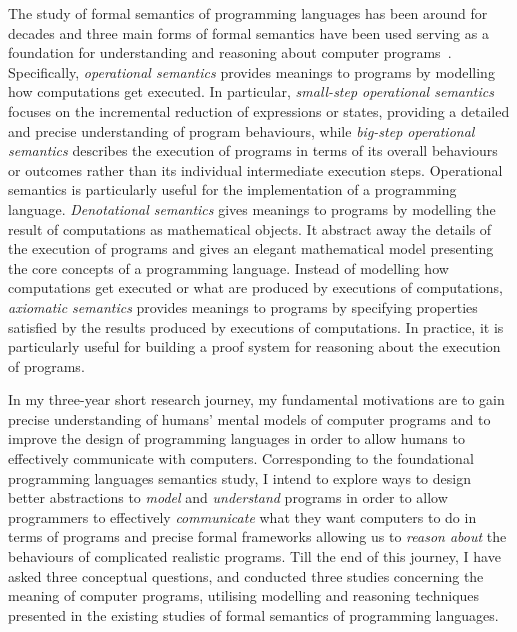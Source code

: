 The study of formal semantics of programming languages has been around for decades and three main forms of formal semantics have been used serving as a foundation for understanding and reasoning about computer programs~\citep{10.5555/151145, citeulike:105547}. Specifically, \emph{operational semantics} provides meanings to programs by modelling how computations get executed. In particular, \emph{small-step operational semantics} focuses on the incremental reduction of expressions or states, providing a detailed and precise understanding of program behaviours, while \emph{big-step operational semantics} describes the execution of programs in terms of its overall behaviours or outcomes rather than its individual intermediate execution steps. Operational semantics is particularly useful for the implementation of a programming language. \emph{Denotational semantics} gives meanings to programs by modelling the result of computations as mathematical objects. It abstract away the details of the execution of programs and gives an elegant mathematical model presenting the core concepts of a programming language. Instead of modelling how computations get executed or what are produced by executions of computations, \emph{axiomatic semantics} provides meanings to programs by specifying properties satisfied by the results produced by executions of computations. In practice, it is particularly useful for building a proof system for reasoning about the execution of programs.

In my three-year short research journey, my fundamental motivations are to gain precise understanding of humans' mental models of computer programs and to improve the design of programming languages in order to allow humans to effectively communicate with computers. Corresponding to the foundational programming languages semantics study, I intend to explore ways to design better abstractions to \emph{model} and \emph{understand} programs in order to allow programmers to effectively \emph{communicate} what they want computers to do in terms of programs and precise formal frameworks allowing us to \emph{reason about} the behaviours of complicated realistic programs.
Till the end of this journey, I have asked three conceptual questions, and conducted three studies concerning the meaning of computer programs, utilising modelling and reasoning techniques presented in the existing studies of formal semantics of programming languages.



